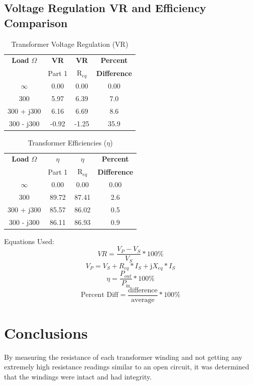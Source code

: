 \documentclass{article}
\begin{document}
\subsection{Voltage Regulation VR and Efficiency Comparison}
\begin{table}[H]
  \centering
  \begin{tabular}{*{4}{c}}
    \textbf{Load} $\Omega$ & \textbf{VR} & \textbf{VR} & \textbf{Percent} \\
    & Part 1 & R$_{eq}$ & \textbf{Difference} \\
    \hline
    $\infty$ & 0.00 & 0.00 & 0.00 \\
    300 & 5.97 & 6.39 & 7.0 \\
    300 + j300 & 6.16 & 6.69 & 8.6 \\
    300 - j300 & -0.92 & -1.25 & 35.9 \\
  \end{tabular}
  \caption{Transformer Voltage Regulation (VR)}
  \label{tab:vr}
\end{table}

\begin{table}[H]
  \centering
  \begin{tabular}{*{4}{c}}
    \textbf{Load} $\Omega$ & $\eta$ & $\eta$ & \textbf{Percent} \\
    & Part 1 & R$_{eq}$ & \textbf{Difference} \\
    \hline
    $\infty$ & 0.00 & 0.00 & 0.00 \\
    300 & 89.72 & 87.41 & 2.6 \\
    300 + j300 & 85.57 & 86.02 & 0.5 \\
    300 - j300 & 86.11 & 86.93 & 0.9 \\
  \end{tabular}
  \caption{Transformer Efficiencies ($\eta$)}
  \label{tab:eff}
\end{table}

Equations Used:
\[VR = \frac{V_P - V_S}{V_S} * 100\%\]
\[V_P = V_S + R_{eq} * I_S + \text{j}X_{eq} * I_S\]
\[\eta = \frac{P_{out}}{P_\text{in}} * 100\% \]
\[\text{Percent Diff} = \frac{\text{difference}}{\text{average}} * 100\%\]

\section{Conclusions}

By measuring the resistance of each transformer winding and not getting any
extremely high resistance readings similar to an open circuit, it was
determined that the windings were intact and had integrity.
\end{document}
